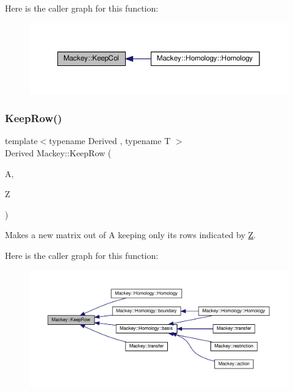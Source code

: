 Here is the caller graph for this function\+:\nopagebreak
\begin{figure}[H]
\begin{center}
\leavevmode
\includegraphics[width=350pt]{namespaceMackey_a165eecd4244c7e736cd453016a80ec29_icgraph}
\end{center}
\end{figure}
\mbox{\label{namespaceMackey_abb970fabb37932c8d2084fb9cd1aff3f}} 
\subsubsection{\texorpdfstring{Keep\+Row()}{KeepRow()}}
{\footnotesize\ttfamily template$<$typename Derived , typename T $>$ \\
Derived Mackey\+::\+Keep\+Row (\begin{DoxyParamCaption}\item[{const Eigen\+::\+Matrix\+Base$<$ Derived $>$ \&}]{A,  }\item[{const T \&}]{Z }\end{DoxyParamCaption})}



Makes a new matrix out of A keeping only its rows indicated by \hyperlink{classZ}{Z}. 

Here is the caller graph for this function\+:\nopagebreak
\begin{figure}[H]
\begin{center}
\leavevmode
\includegraphics[width=350pt]{namespaceMackey_abb970fabb37932c8d2084fb9cd1aff3f_icgraph}
\end{center}
\end{figure}
\mbox{\label{namespaceMackey_a5d8ae76ffb9440e27bfca124d26ee1b2}} 
